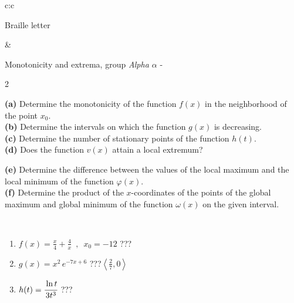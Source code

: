 \documentclass[10pt]{report}
\begin{document}
\begin{tabular}{c:c}
\begin{minipage}[c][104.5mm][t]{0.5\linewidth}
\begin{center}
\begin{minipage}{0.20\linewidth}
\begin{center}
{\small Braille letter}
\end{center}
\end{minipage}
\end{center}
\end{minipage}
&
\begin{minipage}[c][104.5mm][t]{0.5\linewidth}
\begin{center}
\vspace{5mm}
{\huge Monotonicity and extrema, group \textit{Alpha $\alpha$} -}\\[5mm]
\begin{minipage}{0.95\linewidth}
\begin{center}
{\small \begin{multicols}{2} \raggedright
\textbf{(a)} Determine the monotonicity of the function \(f(x)\) in the neighborhood of the point \(x_0\). \\[1mm]
\textbf{(b)} Determine the intervals on which the function \(g(x)\) is decreasing. \\[1mm]
\textbf{(c)} Determine the number of stationary points of the function \(h(t)\). \\[1mm]
\textbf{(d)} Does the function \(v(x)\) attain a local extremum? \par \columnbreak
\textbf{(e)} Determine the difference between the values of the local maximum and the local minimum of the function \(\varphi(x)\). \\[1mm]
\textbf{(f)} Determine the product of the \(x\)-coordinates of the points of the global maximum and global minimum of the function \(\omega(x)\) on the given interval. \\[1mm]
\end{multicols}
}
\end{center}
\end{minipage}
\\[1mm]
\begin{minipage}{0.79\linewidth}
\begin{center}
\begin{varwidth}{\linewidth}
\setlength{\itemsep}{0pt}
\begin{enumerate}
\normalsize
\item $f(x)=\frac{x}{4}+\frac{4}{x} \enspace , \enspace x_0=-12$\quad \dotfill\; ???\;\dotfill \quad {}
\item $g(x)=x^2\, e^{-7x+6}$\quad \dotfill\; ???\;\dotfill \quad $\left\langle\frac{2}{7} , 0\right\rangle$
\item $h(t)=\cfrac{\ln t}{3t^3}$\quad \dotfill\; ???\;\dotfill {}

\end{enumerate}
\end{varwidth}
\end{center}
\end{minipage}
\end{center}
\end{minipage}
\end{tabular}
\end{document}
